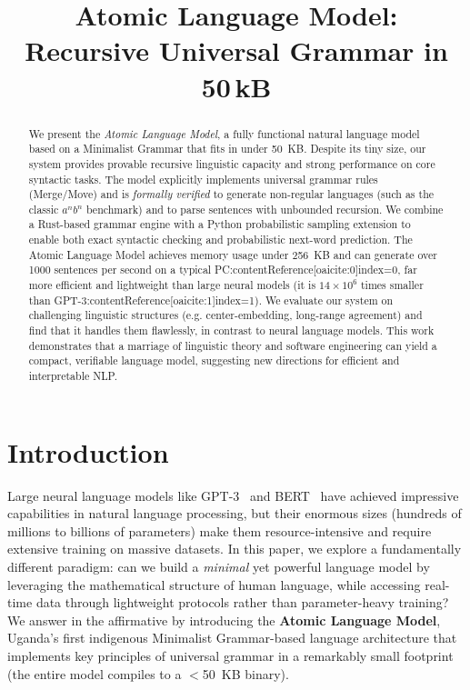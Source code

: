 \documentclass[11pt]{article}
\title{\textbf{Atomic Language Model:\\ Recursive Universal Grammar in 50\,kB}}
\author{  \texttt{}}
\date{}
\begin{document}
\maketitle

\begin{abstract}
We present the \emph{Atomic Language Model}, a fully functional natural language model based on a Minimalist Grammar that fits in under 50~KB. Despite its tiny size, our system provides provable recursive linguistic capacity and strong performance on core syntactic tasks. The model explicitly implements universal grammar rules (Merge/Move) and is \emph{formally verified} to generate non-regular languages (such as the classic $a^n b^n$ benchmark) and to parse sentences with unbounded recursion. We combine a Rust-based grammar engine with a Python probabilistic sampling extension to enable both exact syntactic checking and probabilistic next-word prediction. The Atomic Language Model achieves memory usage under 256~KB and can generate over 1000 sentences per second on a typical PC:contentReference[oaicite:0]{index=0}, far more efficient and lightweight than large neural models (it is $14{\times}10^6$ times smaller than GPT-3:contentReference[oaicite:1]{index=1}). We evaluate our system on challenging linguistic structures (e.g. center-embedding, long-range agreement) and find that it handles them flawlessly, in contrast to neural language models. This work demonstrates that a marriage of linguistic theory and software engineering can yield a compact, verifiable language model, suggesting new directions for efficient and interpretable NLP.
\end{abstract}

\section{Introduction}
Large neural language models like GPT-3~\cite{brown2020} and BERT~\cite{devlin2019} have achieved impressive capabilities in natural language processing, but their enormous sizes (hundreds of millions to billions of parameters) make them resource-intensive and require extensive training on massive datasets. In this paper, we explore a fundamentally different paradigm: can we build a \emph{minimal} yet powerful language model by leveraging the mathematical structure of human language, while accessing real-time data through lightweight protocols rather than parameter-heavy training? We answer in the affirmative by introducing the \textbf{Atomic Language Model}, Uganda's first indigenous Minimalist Grammar-based language architecture that implements key principles of universal grammar in a remarkably small footprint (the entire model compiles to a $<$50~KB binary).
\end{document}
